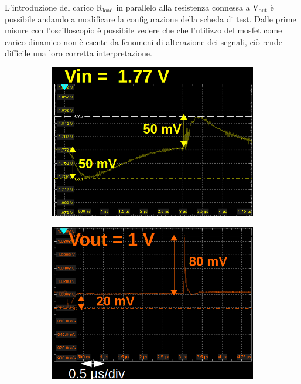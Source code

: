 L'introduzione del carico $\mathrm{R_{load}}$ in parallelo alla resistenza connessa a $\mathrm{V_{out}}$ è possibile andando a modificare la configurazione della scheda di test.
Dalle prime misure con l'oscilloscopio è possibile vedere che che l'utilizzo del mosfet come carico dinamico non è esente da fenomeni di alterazione dei segnali, ciò rende difficile una loro corretta interpretazione. 
\begin{figure}
\begin{subfigure}{.5\textwidth}
  \centering
  \includegraphics[width=.96\linewidth]{Immagini/zoomTransientTest1}
  \caption{ }
  \label{TransientTest:sfig1}
\end{subfigure}%
\begin{subfigure}{.5\textwidth}
  \centering
  \includegraphics[width=.95\linewidth]{Immagini/zoomTransientTest2}

\end{subfigure}
\end{figure}
